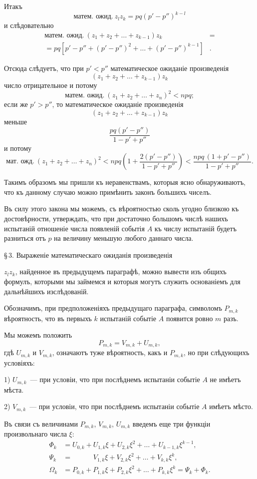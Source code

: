 \documentclass[12pt]{article}
\begin{document}

Итакъ
\[
\text{матем.\ ожид.}\ z_l z_k = pq(p' - p'')^{k-l}
\]
и слѣдовательно
\begin{align*}
\text{матем.\ ожид.}\ (z_1 + z_2 + \ldots + z_{k-1})z_k &= \\
= pq[p' - p'' + (p' - p'')^2 + \ldots + (p' - p'')^{k-1}]&.
\end{align*}

Отсюда слѣдуетъ, что при $p' < p''$ математическое ожиданіе произведенія
\[
(z_1 + z_2 + \ldots + z_{k-1})z_k
\]
число отрицательное и потому
\[
\text{матем.\ ожид.}\ (z_1 + z_2 + \ldots + z_n)^2 < npq;
\]
если же $p' > p''$, то математическое ожиданіе произведенія
\[
(z_1 + z_2 + \ldots + z_{k-1})z_k
\]
меньше
\[
\frac{pq(p' - p'')}{1 - p' + p''}
\]
и потому
\[
\text{мат.\ ожд.}\ (z_1 + z_2 + \ldots + z_n)^2 < npq\!\left(1 + \frac{2(p' - p'')}{1 - p' + p''}\right)
< \frac{npq\,(1 + p' - p'')}{1 - p' + p''}.
\]

Такимъ образомъ мы пришли къ неравенствамъ, которыя ясно обнаруживаютъ, что къ данному случаю можно примѣнить законъ большихъ чиселъ.

Въ силу этого закона мы можемъ, съ вѣроятностью сколь угодно близкою къ достовѣрности, утверждать, что при достаточно большомъ числѣ нашихъ испытаній отношеніе числа появленій событія $A$ къ числу испытаній будетъ разниться отъ $p$ на величину меньшую любого даннаго числа.

\S\,3. Выраженіе математическаго ожиданія произведенія


\noindent $z_l z_k$, найденное въ предыдущемъ параграфѣ, можно вывести изъ общихъ формулъ, которыми мы займемся и которыя могутъ служить основаніемъ для дальнѣйшихъ изслѣдованій.

Обозначимъ, при предположеніяхъ предыдущаго параграфа, символомъ $P_{m,k}$ вѣроятность, что въ первыхъ $k$ испытаній событіе $A$ появится ровно $m$ разъ.

Мы можемъ положить
\[
P_{m,k} = V_{m,k} + U_{m,k},
\]
гдѣ $U_{m,k}$ и $V_{m,k}$, означаютъ туже вѣроятность, какъ и $P_{m,k}$, но при слѣдующихъ условіяхъ:

1) $U_{m,k}$~--- при условіи, что при послѣднемъ испытаніи событіе $A$ не имѣетъ мѣста.

2) $V_{m,k}$~--- при условіи, что при послѣднемъ испытаніи событіе $A$ имѣетъ мѣсто.

Въ связи съ величинами $P_{m,k}$, $V_{m,k}$, $U_{m,k}$ введемъ еще три функціи произвольнаго числа $\xi$:
\begin{align*}
\Phi_k &= U_{0,k} + U_{1,k}\xi + U_{2,k}\xi^2 + \ldots + U_{k-1,k}\xi^{k-1}, \\
\Psi_k &= \phantom{U_{0,k} + {}} V_{1,k}\xi + V_{2,k}\xi^2 + \ldots + V_{k,k}\xi^k, \\
\Omega_k &= P_{0,k} + P_{1,k}\xi + P_{2,k}\xi^2 + \ldots + P_{k,k}\xi^k = \Psi_k + \Phi_k.
\end{align*}
\end{document}
